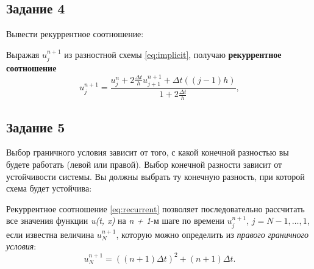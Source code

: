 \documentclass[12pt, a4paper]{report}
\begin{document}
	\newpage

	\subsection*{Задание 4}
	\large
	Вывести рекуррентное соотношение:\par
	Выражая $u_{j}^{n+1}$ из разностной схемы \eqref{eq:implicit}, получаю \textbf{рекуррентное} \textbf{соотношение}
	\begin{equation}\label{eq:recurrent}
		u_{j}^{n+1} = \frac{u_{j}^{n} + 2\frac{\Delta t}{h}u_{j+1}^{n+1} + \Delta t((j - 1)h)}{1 + 2\frac{\Delta t}{h}},
	\end{equation}

	\subsection*{Задание 5}
	\large
	Выбор граничного условия зависит от того, с какой конечной разностью вы будете работать (левой или правой). Выбор конечной разности зависит от устойчивости системы. Вы должны выбрать ту конечную разность, при которой схема будет устойчива: \par
	Рекуррентное соотношение \eqref{eq:recurrent} позволяет последовательно рассчитать все значения функции \textit{u(t, x)} на \textit{n + 1}-м шаге по времени $u_{j}^{n+1}$, $j = N - 1, \dots, 1$, если известна величина $u_{N}^{n+1}$, которую можно определить из \textit{правого} \textit{граничного} \textit{условия}:
	\begin{equation*}
		u_{N}^{n+1} = ((n + 1)\Delta t)^2 + (n + 1)\Delta t.
	\end{equation*}
\end{document}
